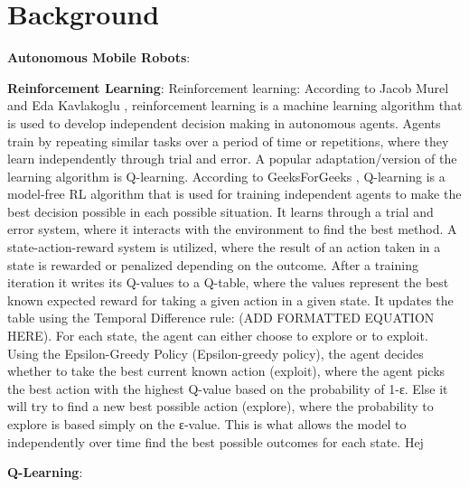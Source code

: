 \section{Background}

\textbf{Autonomous Mobile Robots}:


\textbf{Reinforcement Learning}:
Reinforcement learning: According to Jacob Murel and Eda Kavlakoglu \cite{JacobMurel1RL}, reinforcement learning is a machine learning
algorithm that is used to develop independent decision making in autonomous agents.
Agents train by repeating similar tasks over a period of time or repetitions, where they
learn independently through trial and error. A popular adaptation/version of the learning
algorithm is Q-learning. According to GeeksForGeeks \cite{GeeksForGeeks1RL}, Q-learning is a model-free RL
algorithm that is used for training independent agents to make the best decision
possible in each possible situation. It learns through a trial and error system, where it
interacts with the environment to find the best method. A state-action-reward system is
utilized, where the result of an action taken in a state is rewarded or penalized
depending on the outcome. After a training iteration it writes its Q-values to a Q-table,
where the values represent the best known expected reward for taking a given action in
a given state. It updates the table using the Temporal Difference rule:
(ADD FORMATTED EQUATION HERE). For each state, the agent can either choose to
explore or to exploit. Using the Epsilon-Greedy Policy (Epsilon-greedy policy), the agent
decides whether to take the best current known action (exploit), where the agent picks
the best action with the highest Q-value based on the probability of 1-ε. Else it will try to
find a new best possible action (explore), where the probability to explore is based
simply on the ε-value. This is what allows the model to independently over time find the
best possible outcomes for each state. Hej


\textbf{Q-Learning}: